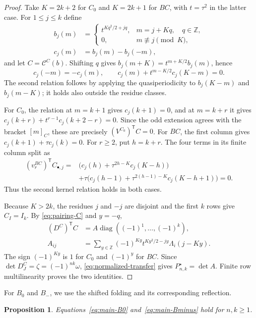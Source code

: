 \documentclass[12pt]{article}
\newtheorem{proposition}[theorem]{Proposition}
\numberwithin{equation}{section}
\newcommand{\Z}{\mathbb Z}
\newcommand{\diag}{\operatorname{diag}}
\begin{document}
\begin{proof}
Take $K=2k+2$ for $C_0$ and $K=2k+1$ for $BC$, with $t=\tau^2$
in the latter case.  For $1\le j\le k$ define
\[
\begin{aligned}
 b_j(m)&=
 \begin{cases}
 t^{Kq^2/2+jq},&m=j+Kq,\quad q\in\Z,\\
 0,&m\not\equiv j\pmod K,
 \end{cases}\\
 c_j(m)&=b_j(m)-b_j(-m),
\end{aligned}
\]
and let $C=\mathcal C^C(b)$.  Shifting $q$ gives
$b_j(m+K)=t^{m+K/2}b_j(m)$, hence
\begin{equation}\label{eq:ordinary-C-reflection}
 c_j(-m)=-c_j(m),\qquad
 c_j(m)+t^{m-K/2}c_j(K-m)=0.
\end{equation}
The second relation follows by applying the quasiperiodicity to
$b_j(K-m)$ and $b_j(m-K)$; it holds also outside the residue classes.

For $C_0$, the relation at $m=k+1$ gives $c_j(k+1)=0$, and at
$m=k+r$ it gives
$c_j(k+r)+t^{r-1}c_j(k+2-r)=0$.  Since the odd extension agrees with
the bracket $[m]_C$, these are precisely
$(V^{C_0})^{\mathsf T}C=0$.
For $BC$, the first column gives
$c_j(k+1)+\tau c_j(k)=0$.
For $r\ge2$, put $h=k+r$.  The four terms in its finite column split as
\begin{align*}
 (v_r^{BC})^{\mathsf T}C_{\bullet,j}
 ={}&\bigl(c_j(h)+\tau^{2h-K}c_j(K-h)\bigr)\\
 &+\tau\bigl(c_j(h-1)+\tau^{2(h-1)-K}c_j(K-h+1)\bigr)=0.
\end{align*}
Thus the second kernel relation holds in both cases.

Because $K>2k$, the residues $j$ and $-j$ are disjoint and the first
$k$ rows give $C_I=I_k$.  By \eqref{eq:pairing-C} and $y=-q$,
\[
\begin{aligned}
 (D^C)^{\mathsf T}C&=A\diag((-1)^1,\ldots,(-1)^k),\\
 A_{ij}&=\sum_{y\in\Z}(-1)^{Ky}t^{Ky^2/2-jy}\Lambda_i(j-Ky).
\end{aligned}
\]
The sign $(-1)^{Ky}$ is $1$ for $C_0$ and $(-1)^y$ for $BC$.
Since $\det D^C_J=\zeta=(-1)^{nk}\omega$,
\eqref{eq:normalized-transfer} gives $P^\star_{n,k}=\det A$.
Finite row multilinearity proves the two identities.
\end{proof}

For $B_0$ and $B_-$, we use the shifted folding and its
corresponding reflection.

\begin{proposition}
Equations~\eqref{eq:main-B0} and~\eqref{eq:main-Bminus} hold for $n,k\ge1$.
\end{proposition}
\end{document}

